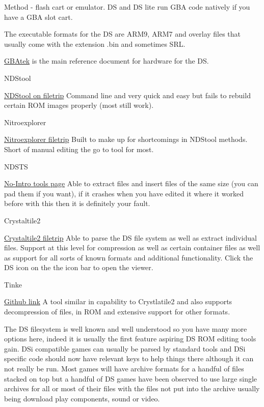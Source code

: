 \documentclass[
]{book}
\begin{document}
Method - flash cart or emulator. DS and DS lite run GBA code natively if you have a GBA slot cart.

The executable formats for the DS are ARM9, ARM7 and overlay files that usually come with the extension .bin and sometimes SRL.

\href{http://problemkaputt.de/gbatek.htm}{GBAtek} is the main reference document for hardware for the DS.

NDStool

\href{http://filetrip.net/nds-downloads/utilities/download-nintendo-ds-rom-tool-ndstool-1501-f29352.html}{NDStool on filetrip} Command line and very quick and easy but fails to rebuild certain ROM images properly (most still work).

Nitroexplorer

\href{http://filetrip.net/nds-downloads/utilities/download-nitroexplorer-2b-f7301.html}{Nitroexplorer filetrip} Built to make up for shortcomings in NDStool methods. Short of manual editing the go to tool for most.

NDSTS

\href{http://www.no-intro.org/tools.htm}{No-Intro tools page} Able to extract files and insert files of the same size (you can pad them if you want), if it crashes when you have edited it where it worked before with this then it is definitely your fault.

Crystaltile2

\href{http://filetrip.net/nds-downloads/utilities/download-crystaltile2-20100906-f23649.html}{Crystaltile2 filetrip} Able to parse the DS file system as well as extract individual files. Support at this level for compression as well as certain container files as well as support for all sorts of known formats and additional functionality. Click the DS icon on the the icon bar to open the viewer.

Tinke

\href{https://github.com/pleonex/tinke/}{Github link} A tool similar in capability to Crystlatile2 and also supports decompression of files, in ROM and extensive support for other formats.

The DS filesystem is well known and well understood so you have many more options here, indeed it is usually the first feature aspiring DS ROM editing tools gain. DSi compatible games can usually be parsed by standard tools and DSi specific code should now have relevant keys to help things there although it can not really be run. Most games will have archive formats for a handful of files stacked on top but a handful of DS games have been observed to use large single archives for all or most of their files with the files not put into the archive usually being download play components, sound or video.
\end{document}
